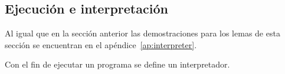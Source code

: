 \begin{comment}
Se comienza demostrando que cualquier paso tomado en la semántica de pasos cortos puede ser simulado a través de un paso tomado con \verb|fstep|.

\begin{lemma}[fstep1]
$\newline$
$s\ \rightarrow\ s'\ \Longrightarrow\ \mathtt{fstep}\ s\ =\ s'$
\label{lemma:fstep1}
\end{lemma}

\begin{proof}
La demostración es por inducción sobre la semántica de pasos cortos.
\end{proof}

Luego se considera la dirección opuesta:

\begin{lemma}[fstep2]
$\newline$
$\neg\ \mathtt{is\_empty\_stack}\ s\ \Longrightarrow\ s\ \rightarrow\ (\mathtt{fstep}\ s)$
\label{lemma:fstep2}
\end{lemma}

\begin{proof}
La demostración se hace automáticamente mediante una prueba por casos sobre el resultado de ``\verb|tr_return_void| $s$'' y utilizando los lemas~\ref{lemma:can_take_step} y~\ref{lemma:fstep1}.
\end{proof}

Ambas direcciones juntas (lema~\ref{lemma:fstep1} y lema~\ref{lemma:fstep2}) permiten demostrar la equivalencia planteada al inicio:

\begin{lemma}[ss\_fstep\_equiv]
$\newline$
$\neg\ \mathtt{is\_empty\_stack}\ \Longrightarrow\ s\ \rightarrow\ s'\ \longleftrightarrow\ \mathtt{fstep}\ s\ =\ s'$
\label{lemma:ss_fstep_equiv}
\end{lemma}
\end{comment}


\subsection{Ejecución e interpretación}\label{subsection:exec_interp}

Al igual que en la sección anterior las demostraciones para los lemas de esta sección se encuentran en el apéndice~\ref{ap:interpreter}.

Con el fin de ejecutar un programa se define un interpretador.

